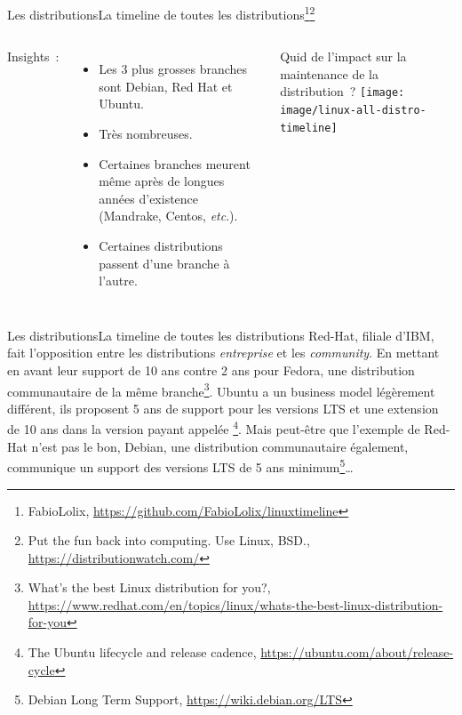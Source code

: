 \documentclass{beamer}
\begin{document}
    \begin{frame}{Les distributions}{La timeline de toutes les distributions\footnote{FabioLolix, \url{https://github.com/FabioLolix/linuxtimeline}}\footnotestep\footnote{Put the fun back into computing. Use Linux, BSD., \url{https://distributionwatch.com/}}}
        \begin{columns}
            Insights~:
            \begin{itemize}
                \item Les 3 plus grosses branches sont Debian, Red Hat et Ubuntu.
                \item Très nombreuses.
                \item Certaines branches meurent même après de longues années d'existence (Mandrake, Centos, \textit{etc}.).
                \item Certaines distributions passent d'une branche à l'autre.
            \end{itemize}
            Quid de l'impact sur la maintenance de la distribution~?
            \centering
            \texttt{[image: image/linux-all-distro-timeline]}
        \end{columns}
    \end{frame}

    \begin{frame}{Les distributions}{La timeline de toutes les distributions}
        Red-Hat, filiale d'IBM, fait l'opposition entre les distributions \textit{entreprise} et les \textit{community}.
        En mettant en avant leur support de 10 ans contre 2 ans pour Fedora, une distribution communautaire de la même branche\footnote{What's the best Linux distribution for you?, \url{https://www.redhat.com/en/topics/linux/whats-the-best-linux-distribution-for-you}}.
        \bigbreak
        Ubuntu a un business model légèrement différent, ils proposent 5 ans de support pour les versions LTS et une extension de 10 ans dans la version payant appelée \footnote{The Ubuntu lifecycle and release cadence, \url{https://ubuntu.com/about/release-cycle}}.
        \bigbreak
        Mais peut-être que l'exemple de Red-Hat n'est pas le bon, Debian, une distribution communautaire également, communique un support des versions LTS de 5 ans minimum\footnote{Debian Long Term Support, \url{https://wiki.debian.org/LTS}}\ldots
    \end{frame}
\end{document}
